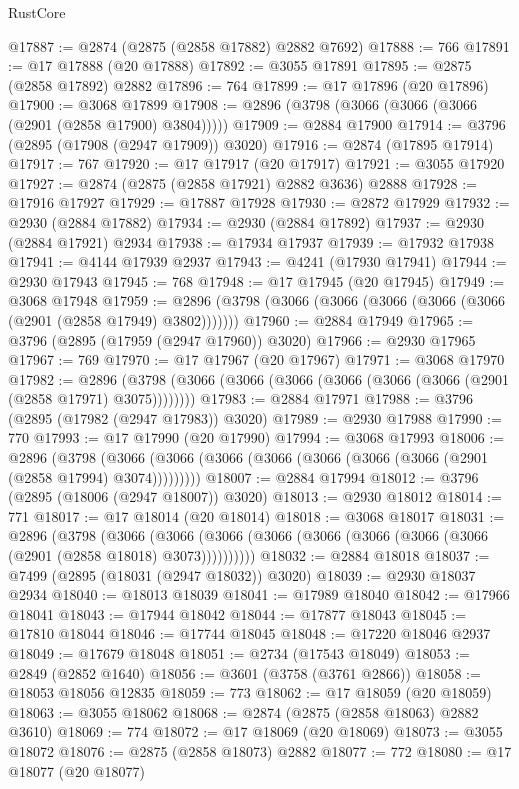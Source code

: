 \begin{lexlean}{RustCore}
\begin{coremodule}
@17887 := @2874 (@2875 (@2858 @17882) @2882 @7692)
@17888 := 766
@17891 := @17 @17888 (@20 @17888)
@17892 := @3055 @17891
@17895 := @2875 (@2858 @17892) @2882
@17896 := 764
@17899 := @17 @17896 (@20 @17896)
@17900 := @3068 @17899
@17908 := @2896 (@3798 (@3066 (@3066 (@3066 (@2901 (@2858 @17900) @3804)))))
@17909 := @2884 @17900
@17914 := @3796 (@2895 (@17908 (@2947 @17909)) @3020)
@17916 := @2874 (@17895 @17914)
@17917 := 767
@17920 := @17 @17917 (@20 @17917)
@17921 := @3055 @17920
@17927 := @2874 (@2875 (@2858 @17921) @2882 @3636) @2888
@17928 := @17916 @17927
@17929 := @17887 @17928
@17930 := @2872 @17929
@17932 := @2930 (@2884 @17882)
@17934 := @2930 (@2884 @17892)
@17937 := @2930 (@2884 @17921) @2934
@17938 := @17934 @17937
@17939 := @17932 @17938
@17941 := @4144 @17939 @2937
@17943 := @4241 (@17930 @17941)
@17944 := @2930 @17943
@17945 := 768
@17948 := @17 @17945 (@20 @17945)
@17949 := @3068 @17948
@17959 := @2896 (@3798 (@3066 (@3066 (@3066 (@3066 (@3066 (@2901 (@2858 @17949) @3802)))))))
@17960 := @2884 @17949
@17965 := @3796 (@2895 (@17959 (@2947 @17960)) @3020)
@17966 := @2930 @17965
@17967 := 769
@17970 := @17 @17967 (@20 @17967)
@17971 := @3068 @17970
@17982 := @2896 (@3798 (@3066 (@3066 (@3066 (@3066 (@3066 (@3066 (@2901 (@2858 @17971) @3075))))))))
@17983 := @2884 @17971
@17988 := @3796 (@2895 (@17982 (@2947 @17983)) @3020)
@17989 := @2930 @17988
@17990 := 770
@17993 := @17 @17990 (@20 @17990)
@17994 := @3068 @17993
@18006 := @2896
    (@3798 (@3066 (@3066 (@3066 (@3066 (@3066 (@3066 (@3066 (@2901 (@2858 @17994) @3074)))))))))
@18007 := @2884 @17994
@18012 := @3796 (@2895 (@18006 (@2947 @18007)) @3020)
@18013 := @2930 @18012
@18014 := 771
@18017 := @17 @18014 (@20 @18014)
@18018 := @3068 @18017
@18031 := @2896
    (@3798
      (@3066 (@3066 (@3066 (@3066 (@3066 (@3066 (@3066 (@3066 (@2901 (@2858 @18018) @3073))))))))))
@18032 := @2884 @18018
@18037 := @7499 (@2895 (@18031 (@2947 @18032)) @3020)
@18039 := @2930 @18037 @2934
@18040 := @18013 @18039
@18041 := @17989 @18040
@18042 := @17966 @18041
@18043 := @17944 @18042
@18044 := @17877 @18043
@18045 := @17810 @18044
@18046 := @17744 @18045
@18048 := @17220 @18046 @2937
@18049 := @17679 @18048
@18051 := @2734 (@17543 @18049)
@18053 := @2849 (@2852 @1640)
@18056 := @3601 (@3758 (@3761 @2866))
@18058 := @18053 @18056 @12835
@18059 := 773
@18062 := @17 @18059 (@20 @18059)
@18063 := @3055 @18062
@18068 := @2874 (@2875 (@2858 @18063) @2882 @3610)
@18069 := 774
@18072 := @17 @18069 (@20 @18069)
@18073 := @3055 @18072
@18076 := @2875 (@2858 @18073) @2882
@18077 := 772
@18080 := @17 @18077 (@20 @18077)

\end{coremodule}
\end{lexlean}
